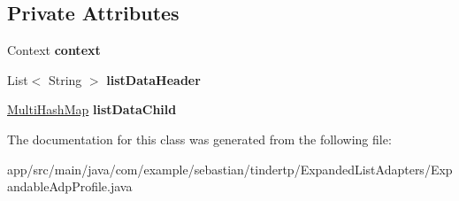 \subsection*{Private Attributes}
\begin{DoxyCompactItemize}
\item 
Context {\bfseries context}\hypertarget{classcom_1_1example_1_1sebastian_1_1tindertp_1_1ExpandedListAdapters_1_1ExpandableAdpProfile_af42baf91d4b41e68181d27cc93f3ef79}{}\label{classcom_1_1example_1_1sebastian_1_1tindertp_1_1ExpandedListAdapters_1_1ExpandableAdpProfile_af42baf91d4b41e68181d27cc93f3ef79}

\item 
List$<$ String $>$ {\bfseries list\+Data\+Header}\hypertarget{classcom_1_1example_1_1sebastian_1_1tindertp_1_1ExpandedListAdapters_1_1ExpandableAdpProfile_a489e886d8cafb5fbff0dac571f0884a5}{}\label{classcom_1_1example_1_1sebastian_1_1tindertp_1_1ExpandedListAdapters_1_1ExpandableAdpProfile_a489e886d8cafb5fbff0dac571f0884a5}

\item 
\hyperlink{classcom_1_1example_1_1sebastian_1_1tindertp_1_1commonTools_1_1MultiHashMap}{Multi\+Hash\+Map} {\bfseries list\+Data\+Child}\hypertarget{classcom_1_1example_1_1sebastian_1_1tindertp_1_1ExpandedListAdapters_1_1ExpandableAdpProfile_a5e7070ddb37f9858dfcb374a6885b179}{}\label{classcom_1_1example_1_1sebastian_1_1tindertp_1_1ExpandedListAdapters_1_1ExpandableAdpProfile_a5e7070ddb37f9858dfcb374a6885b179}

\end{DoxyCompactItemize}


The documentation for this class was generated from the following file\+:\begin{DoxyCompactItemize}
\item 
app/src/main/java/com/example/sebastian/tindertp/\+Expanded\+List\+Adapters/Expandable\+Adp\+Profile.\+java\end{DoxyCompactItemize}
